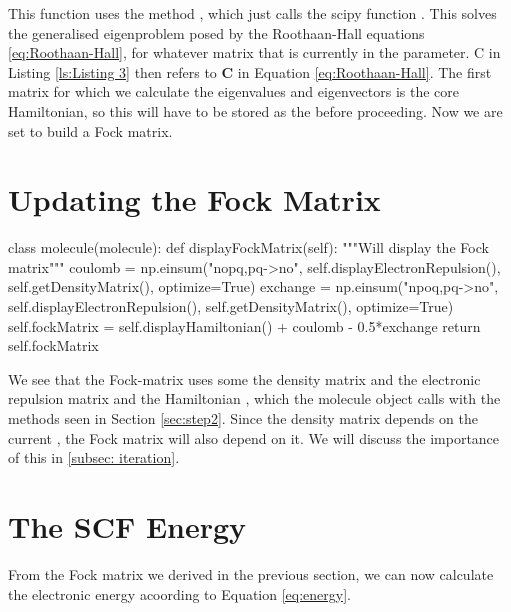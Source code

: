 This function uses the method , which just calls 
the scipy function . This solves the generalised 
eigenproblem posed by the Roothaan-Hall equations \eqref{eq:Roothaan-Hall}, 
for whatever matrix that is currently in the  
parameter. C in Listing \ref{ls:Listing 3} then refers to \textbf{C} in Equation 
\eqref{eq:Roothaan-Hall}. The first matrix for which we calculate the eigenvalues 
and eigenvectors is the core Hamiltonian, so this will have to be stored as the 
 before proceeding. Now we are set to build a Fock 
matrix.

\section{Updating the Fock Matrix}
\label{sec:step4}


    
\begin{python}[caption={calculating the Fock matrix},label={ls:Listing 4}]
    class molecule(molecule):
        def displayFockMatrix(self):
            """Will display the Fock matrix"""
            coulomb = np.einsum("nopq,pq->no", 
                    self.displayElectronRepulsion(), 
                    self.getDensityMatrix(), optimize=True)
            exchange = np.einsum("npoq,pq->no", 
                    self.displayElectronRepulsion(), 
                    self.getDensityMatrix(), optimize=True)
            self.fockMatrix = self.displayHamiltonian() 
                            + coulomb - 0.5*exchange
            return self.fockMatrix
\end{python}
 
 
We see that the Fock-matrix uses some the density matrix and the electronic 
repulsion matrix and the Hamiltonian , which the molecule object calls with the 
methods seen in Section \ref{sec:step2}. Since the density matrix depends on the 
current , the Fock matrix will also depend on it. 
We will discuss the importance of this in \ref{subsec: iteration}. 

 
 \section{The SCF Energy}
 \label{sec:step5}
 From the Fock matrix we derived in the previous section, we can now calculate the electronic energy acoording to Equation \eqref{eq:energy}.
 
